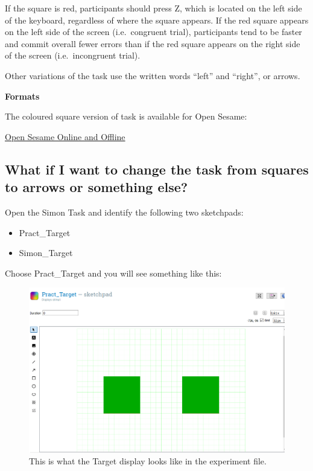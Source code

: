 \documentclass[
]{book}
\begin{document}
If the square is red, participants should press Z, which is located on the left side of the keyboard, regardless of where the square appears. If the red square appears on the left side of the screen (i.e.~congruent trial), participants tend to be faster and commit overall fewer errors than if the red square appears on the right side of the screen (i.e.~incongruent trial).

Other variations of the task use the written words ``left'' and ``right'', or arrows.

\textbf{Formats}

The coloured square version of task is available for Open Sesame:

\href{link\%20here}{Open Sesame Online and Offline}

\hypertarget{what-if-i-want-to-change-the-task-from-squares-to-arrows-or-something-else}{%
\subsection{What if I want to change the task from squares to arrows or something else?}\label{what-if-i-want-to-change-the-task-from-squares-to-arrows-or-something-else}}

Open the Simon Task and identify the following two sketchpads:

\begin{itemize}
\item
  Pract\_Target
\item
  Simon\_Target
\end{itemize}

Choose Pract\_Target and you will see something like this:

\begin{figure}

{\centering \includegraphics[width=0.99\linewidth]{images/changesimon/01Pract_Target} 

}

\caption{This is what the Target display looks like in the experiment file.}\label{fig:Figure2-5}
\end{figure}
\end{document}
